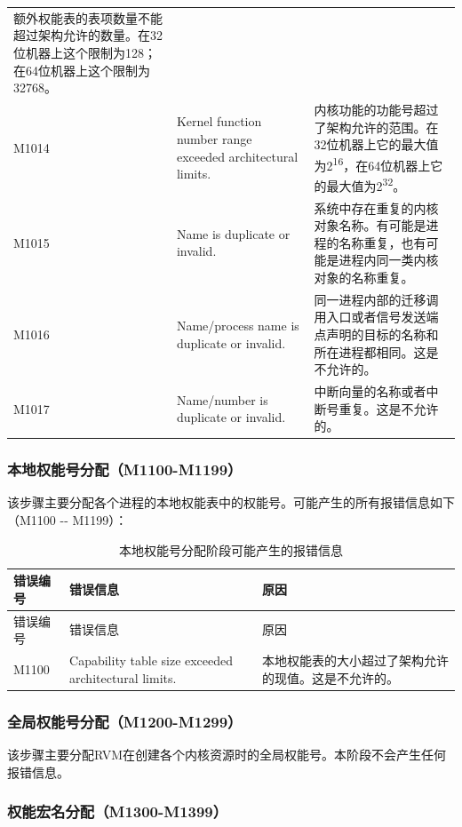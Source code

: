 \begin{xltabular}{\textwidth}{@{}>{\hsize\raggedright\arraybackslash}X>{\hsize\raggedright\arraybackslash}X>{\hsize\raggedright\arraybackslash}X@{}}
额外权能表的表项数量不能超过架构允许的数量。在32位机器上这个限制为128；在64位机器上这个限制为32768。\tabularnewline
M1014 & Kernel function number range exceeded architectural limits. &
内核功能的功能号超过了架构允许的范围。在32位机器上它的最大值为2\textsuperscript{16}，在64位机器上它的最大值为2\textsuperscript{32}。\tabularnewline
M1015 & Name is duplicate or invalid. &
系统中存在重复的内核对象名称。有可能是进程的名称重复，也有可能是进程内同一类内核对象的名称重复。\tabularnewline
M1016 & Name/process name is duplicate or invalid. &
同一进程内部的迁移调用入口或者信号发送端点声明的目标的名称和所在进程都相同。这是不允许的。\tabularnewline
M1017 & Name/number is duplicate or invalid. &
中断向量的名称或者中断号重复。这是不允许的。\tabularnewline
\end{xltabular}

\newpage
{}
\subsubsection{本地权能号分配（M1100-M1199）}\label{subsubsec:5-6-5-2}

该步骤主要分配各个进程的本地权能表中的权能号。可能产生的所有报错信息如下（M1100
-\/- M1199）：

\begin{xltabular}{\textwidth}{@{}>{\hsize\raggedright\arraybackslash}X>{\hsize\raggedright\arraybackslash}X>{\hsize\raggedright\arraybackslash}X@{}}
\caption{本地权能号分配阶段可能产生的报错信息}\label{tab:5-21}\\
\toprule
错误编号 & 错误信息 & 原因\tabularnewline
\endfirsthead
\toprule
错误编号 & 错误信息 & 原因\tabularnewline
\midrule
\endhead
\bottomrule
\endlastfoot
M1100 & Capability table size exceeded architectural limits. &
本地权能表的大小超过了架构允许的现值。这是不允许的。\tabularnewline
\end{xltabular}

\subsubsection{全局权能号分配（M1200-M1299）}\label{subsubsec:5-6-5-3}

该步骤主要分配RVM在创建各个内核资源时的全局权能号。本阶段不会产生任何报错信息。

\newpage
\subsubsection{权能宏名分配（M1300-M1399）}\label{subsubsec:5-6-5-4}

